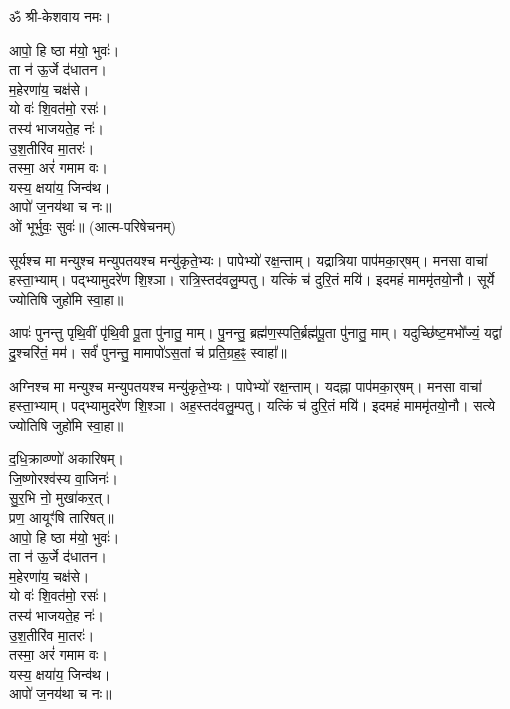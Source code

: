 
ॐ श्री-केशवाय नमः।

आपो॒ हि ष्ठा म॑यो॒ भुवः॑।\\
ता न॑ ऊ॒र्जे द॑धातन।\\
म॒हेरणा॑य॒ चक्ष॑से।\\
यो वः॑ शि॒वत॑मो॒ रसः॑।\\
तस्य॑ भाजयते॒ह नः॑।\\
उ॒श॒तीरि॑व मा॒तरः॑।\\
तस्मा॒ अरं॑ गमाम वः।\\
यस्य॒ क्षया॑य॒ जिन्व॑थ।\\
आपो॑ ज॒नय॑था च नः॥\\

ओं भूर्भुवः॒ सुवः॑॥ (आत्म-परिषेचनम्)

सूर्यश्च मा मन्युश्च मन्युपतयश्च मन्यु॑कृते॒भ्यः। पापेभ्यो॑ रक्ष॒न्ताम्। यद्रात्रिया पाप॑मका॒र्‌षम्। मनसा वाचा॑ हस्ता॒भ्याम्। पद्भ्यामुदरे॑ण शि॒श्ञा। रात्रि॒स्तद॑वलु॒म्पतु। यत्किं च॑ दुरि॒तं मयि॑। इदमहं माममृ॑तयो॒नौ। सूर्ये ज्योतिषि जुहो॑मि स्वा॒हा॥


आपः॑ पुनन्तु पृथि॒वीं पृ॑थि॒वी पू॒ता पु॑नातु॒ माम्। पु॒नन्तु॒ ब्रह्म॑ण॒स्पति॒र्ब्रह्म॑पू॒ता पु॑नातु॒ माम्। यदुच्छि॑ष्ट॒मभो᳚ज्यं॒ यद्वा॑ दु॒श्चरि॑तं॒ मम॑। सर्वं॑ पुनन्तु॒ मामापो॑ऽस॒तां च॑ प्रति॒ग्रह॒ꣴ॒ स्वाहा᳚॥


अग्निश्च मा मन्युश्च मन्युपतयश्च मन्यु॑कृते॒भ्यः। पापेभ्यो॑ रक्ष॒न्ताम्। यदह्ना पाप॑मका॒र्‌षम्। मनसा वाचा॑ हस्ता॒भ्याम्। पद्भ्यामुदरे॑ण शि॒श्ञा। अह॒स्तद॑वलु॒म्पतु। यत्किं च॑ दुरि॒तं मयि॑। इदमहं माममृ॑तयो॒नौ। सत्ये ज्योतिषि जुहो॑मि स्वा॒हा॥



द॒धि॒क्राव्ण्णो॑ अकारिषम्।\\
 जि॒ष्णोरश्व॑स्य वा॒जिनः॑।\\
सु॒र॒भि नो॒ मुखा॑कर॒त्।\\
प्रण॒ आयूꣳ॑षि तारिषत्॥\\



आपो॒ हि ष्ठा म॑यो॒ भुवः॑।\\
ता न॑ ऊ॒र्जे द॑धातन।\\
म॒हेरणा॑य॒ चक्ष॑से।\\
यो वः॑ शि॒वत॑मो॒ रसः॑।\\
तस्य॑ भाजयते॒ह नः॑।\\
उ॒श॒तीरि॑व मा॒तरः॑।\\
तस्मा॒ अरं॑ गमाम वः।\\
यस्य॒ क्षया॑य॒ जिन्व॑थ।\\
आपो॑ ज॒नय॑था च नः॥\\

